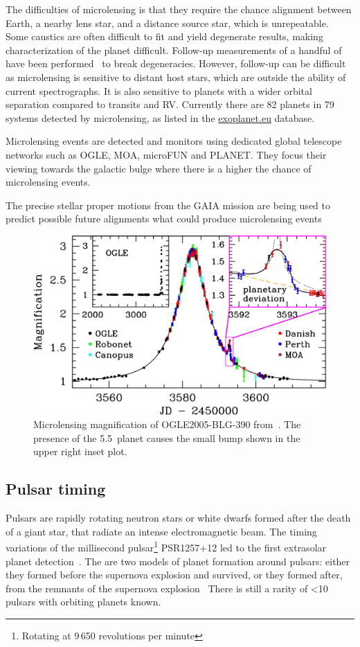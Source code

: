 The difficulties of microlensing is that they require the chance alignment between Earth, a nearby lens star, and a distance source star, which is unrepeatable.
Some caustics are often difficult to fit and yield degenerate results, making characterization of the planet difficult.
Follow-up measurements of a handful of have been performed~\citep[e.g.][]{kubas_frozen_2012, batista_confirmation_2015, santerne_spectroscopic_2016} to break degeneracies. 
However, follow-up can be difficult as microlensing is sensitive to distant host stars, which are outside the ability of current spectrographs.
It is also sensitive to planets with a wider orbital separation  compared to transits and {RV}.
Currently there are 82 planets in 79 systems detected by microlensing, as listed in the \href{https:\\www.exoplanet.eu}{exoplanet.eu} database.

Microlensing events are detected and monitors using dedicated global telescope networks such as {OGLE}, {MOA}, {microFUN} and {PLANET}.
They focus their viewing towards the galactic bulge where there is a higher the chance of microlensing events.

The precise stellar proper motions from the GAIA mission are being used to predict possible future alignments what could produce microlensing events~\citep{kluter_prediction_2018} 


\begin{figure}
    \centering
    \includegraphics[width=0.5\linewidth]{./figures/introduction/Microlensing_OGLE2005-BLG-390.pdf}
    \caption{Microlensing magnification of OGLE2005-BLG-390 from~\citep{beaulieu_discovery_2006}.
        The presence of the 5.5\,\Mjup{} planet causes the small bump shown in the upper right inset plot.}
    \label{fig:microlensing_example}
\end{figure}



\subsection{Pulsar timing}
\label{sub:pulsar_timing}
Pulsars are rapidly rotating neutron stars or white dwarfs formed after the death of a giant star, that radiate an intense electromagnetic beam.
The timing variations of the millisecond pulsar\footnote{Rotating at 9\,650 revolutions per minute} {PSR1257+12} led to the first extrasolar planet detection~\citet{wolszczan_planetary_1992}.
The are two models of planet formation around pulsars: either they formed before the supernova explosion and survived, or they formed after, from the remnants of the supernova explosion~\citep{Starovoit_existence_2017}
There is still a rarity of  <10 pulsars with orbiting planets known.



